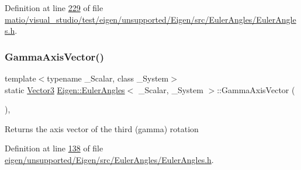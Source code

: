 Definition at line \hyperlink{matio_2visual__studio_2test_2eigen_2unsupported_2_eigen_2src_2_euler_angles_2_euler_angles_8h_source_l00229}{229} of file \hyperlink{matio_2visual__studio_2test_2eigen_2unsupported_2_eigen_2src_2_euler_angles_2_euler_angles_8h_source}{matio/visual\+\_\+studio/test/eigen/unsupported/\+Eigen/src/\+Euler\+Angles/\+Euler\+Angles.\+h}.

\mbox{\label{class_eigen_1_1_euler_angles_a77ea78dac1d599353e2a87d95cc6f1d4}} 
\subsubsection{\texorpdfstring{Gamma\+Axis\+Vector()}{GammaAxisVector()}\hspace{0.1cm}{\footnotesize\ttfamily [1/2]}}
{\footnotesize\ttfamily template$<$typename \+\_\+\+Scalar, class \+\_\+\+System$>$ \\
static \hyperlink{class_eigen_1_1_euler_angles_af0f446aa0f46b3439abedff63fabf39c}{Vector3} \hyperlink{class_eigen_1_1_euler_angles}{Eigen\+::\+Euler\+Angles}$<$ \+\_\+\+Scalar, \+\_\+\+System $>$\+::Gamma\+Axis\+Vector (\begin{DoxyParamCaption}{ }\end{DoxyParamCaption})\hspace{0.3cm}{\ttfamily [inline]}, {\ttfamily [static]}}

\begin{DoxyReturn}{Returns}
the axis vector of the third (gamma) rotation 
\end{DoxyReturn}


Definition at line \hyperlink{eigen_2unsupported_2_eigen_2src_2_euler_angles_2_euler_angles_8h_source_l00138}{138} of file \hyperlink{eigen_2unsupported_2_eigen_2src_2_euler_angles_2_euler_angles_8h_source}{eigen/unsupported/\+Eigen/src/\+Euler\+Angles/\+Euler\+Angles.\+h}.

\mbox{\label{class_eigen_1_1_euler_angles_a77ea78dac1d599353e2a87d95cc6f1d4}} 
